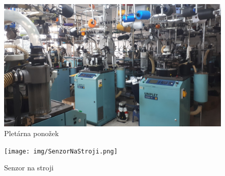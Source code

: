 \begin{figure}[htbp]
    \centering
    \includegraphics[width=\textwidth]{img/Pletarna.png}
    \caption{Pletárna ponožek}
    \label{fig:databaze}
\end{figure}

\begin{figure}[htbp]
    \centering
    \texttt{[image: img/SenzorNaStroji.png]}
    \caption{Senzor na stroji}
    \label{fig:SenzorNaStroji}
\end{figure}

\newpage